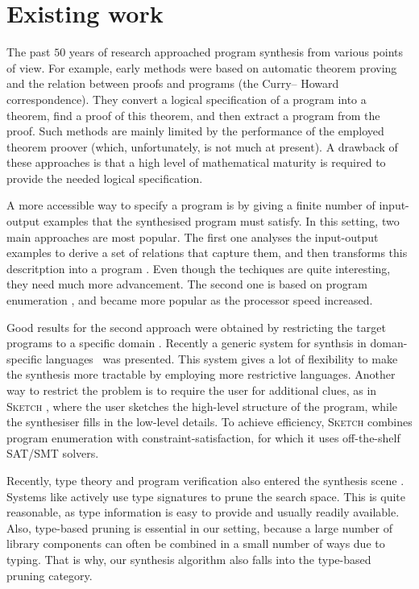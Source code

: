 \section{Existing work}\label{Background}
The past $50$ years of research approached program synthesis from various points of view.  For example, early methods \cite{Manna:1980:DAP:357084.357090} were based on automatic theorem proving and the relation between proofs and programs (the Curry– Howard correspondence).  They convert a logical specification of a program into a theorem, find a proof of this theorem, and then extract a program from the proof.  Such methods are mainly limited by the performance of the employed theorem proover (which, unfortunately, is not much at present).  A drawback of these approaches is that a high level of mathematical maturity is required to provide the needed logical specification.

A more accessible way to specify a program is by giving a finite number of input-output examples that the synthesised program must satisfy.  In this setting, two main approaches are most popular.  The first one analyses the input-output examples to derive a set of relations that capture them, and then transforms this descritption into a program \cite{Summers:1977:MLP:321992.322002,Kitzelmann:2009:AIF:1530575.1530582,Jha:2010:OCP:1806799.1806833}.  Even though the techiques are quite interesting, they need much more advancement.  The second one is based on program enumeration \cite{LambdaSquarePaper,EscherPaper,MythPaper}, and became more popular as the processor speed increased.

Good results for the second approach were obtained by restricting the target programs to a specific domain \cite{Fischer:2003:ASG:967842.967845,Frigo98fftw:an,Thies2002,Gulwani:2011:ASP:1926385.1926423,Gulwani:2011:SGC:1993498.1993505}. Recently a generic system for synthsis in doman-specific languages~\cite{Perelman:2014:TS:2594291.2594297} was presented.  This system gives a lot of flexibility to make the synthesis more tractable by employing more restrictive languages.  Another way to restrict the problem is to require the user for additional clues, as in \textsc{Sketch} \cite{Solar-Lezama:2006:CSF:1168857.1168907}, where the user sketches the high-level structure of the program, while the synthesiser fills in the low-level details.  To achieve efficiency, \textsc{Sketch} combines program enumeration with constraint-satisfaction, for which it uses off-the-shelf SAT/SMT solvers.

Recently, type theory and program verification also entered the synthesis scene \cite{LeonPaper,DBLP:journals/corr/InalaQLS15,Kuncak:2010:CFS:1806596.1806632,Frankle:2016:EST:2837614.2837629}.  Systems like \cite{LambdaSquarePaper,MythPaper,SynquidPaper} actively use type signatures to prune the search space.  This is quite reasonable, as type information is easy to provide and usually readily available.  Also, type-based pruning is essential in our setting, because a large number of library components can often be combined in a small number of ways due to typing.  That is why, our synthesis algorithm also falls into the type-based pruning category.

